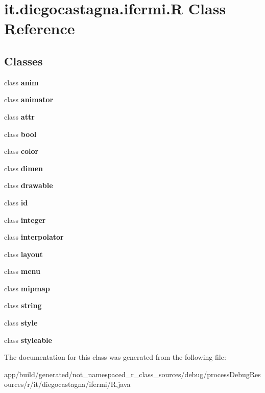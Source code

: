 \hypertarget{classit_1_1diegocastagna_1_1ifermi_1_1_r}{}\section{it.\+diegocastagna.\+ifermi.\+R Class Reference}
\label{classit_1_1diegocastagna_1_1ifermi_1_1_r}
\subsection*{Classes}
\begin{DoxyCompactItemize}
\item 
class {\bfseries anim}
\item 
class {\bfseries animator}
\item 
class {\bfseries attr}
\item 
class {\bfseries bool}
\item 
class {\bfseries color}
\item 
class {\bfseries dimen}
\item 
class {\bfseries drawable}
\item 
class {\bfseries id}
\item 
class {\bfseries integer}
\item 
class {\bfseries interpolator}
\item 
class {\bfseries layout}
\item 
class {\bfseries menu}
\item 
class {\bfseries mipmap}
\item 
class {\bfseries string}
\item 
class {\bfseries style}
\item 
class {\bfseries styleable}
\end{DoxyCompactItemize}


The documentation for this class was generated from the following file\+:\begin{DoxyCompactItemize}
\item 
app/build/generated/not\+\_\+namespaced\+\_\+r\+\_\+class\+\_\+sources/debug/process\+Debug\+Resources/r/it/diegocastagna/ifermi/R.\+java\end{DoxyCompactItemize}
